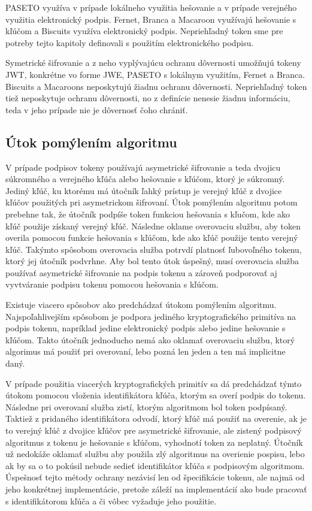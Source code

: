 PASETO využíva v prípade lokálneho využitia hešovanie a v prípade verejného využitia elektronický podpis. Fernet, Branca a Macaroon využívajú hešovanie s kľúčom a Biscuits využíva elektronický podpis. Nepriehľadný token sme pre potreby tejto kapitoly definovali s použitím elektronického podpisu.

Symetrické šifrovanie a z neho vyplývajúcu ochranu dôvernosti umožňujú tokeny JWT, konkrétne vo forme JWE, PASETO s lokálnym využitím, Fernet a Branca. Biscuits a Macaroons neposkytujú žiadnu ochranu dôvernosti. Nepriehľadný token tiež neposkytuje ochranu dôvernosti, no z definície nenesie žiadnu informáciu, teda v jeho prípade nie je dôvernosť čoho chrániť.

\subsection{Útok pomýlením algoritmu}

V prípade podpisov tokeny používajú asymetrické šifrovanie a teda dvojicu súkromného a verejného kľúča alebo hešovanie s kľúčom, ktorý je súkromný. Jediný kľúč, ku ktorému má útočník ľahký prístup je verejný kľúč z dvojice kľúčov použitých pri asymetrickom šifrovaní. Útok pomýlením algoritmu potom prebehne tak, že útočník podpíše token funkciou hešovania s kľučom, kde ako kľúč použije získaný verejný kľúč. Následne oklame overovaciu službu, aby token overila pomocou funkcie hešovania s kľúčom, kde ako kľúč použije tento verejný kľúč. Takýmto spôsobom overovacia služba potrvdí platnosť ľubovoľného tokenu, ktorý jej útočník podvrhne. Aby bol tento útok úspešný, musí overovacia služba používať asymetrické šifrovanie na podpis tokenu a zároveň podporovať aj vyvtváranie podpisu tokenu pomocou hešovania s kľúčom.

Existuje viacero spôsobov ako predchádzať útokom pomýlením algoritmu. Najspoľahlivejším spôsobom je podpora jediného kryptografického primitíva na podpis tokenu, napríklad jedine elektronický podpis alebo jedine hešovanie s kľúčom. Takto útočník jednoducho nemá ako oklamať overovaciu službu, ktorý algorimus má použiť pri overovaní, lebo pozná len jeden a ten má implicitne daný. 

V prípade použitia viacerých kryptografických primitív sa dá predchádzať týmto útokom pomocou vloženia identifikátora kľúča, ktorým sa overí podpis do tokenu. Následne pri overovaní služba zistí, ktorým algoritmom bol token podpísaný. Taktiež z pridaného identifikátora odvodí, ktorý kľúč má použiť na overenie, ak je to verejný kľúč z dvojice kľúčov pre asymetrické šifrovanie, ale zistený podpisový algoritmus z tokenu je hešovanie s kľúčom, vyhodnotí token za neplatný. Útočník už nedokáže oklamať službu aby použila zlý algoritmus na overienie pospisu, lebo ak by sa o to pokúsil nebude sedieť identifikátor kľúča s podpisovým algoritmom. Úspešnosť tejto métody ochrany nezávisí len od špecifikácie tokenu, ale najmä od jeho konkrétnej implementácie, pretože záleží na implementácií ako bude pracovať s identifikátorom kľúča a či vôbec vyžaduje jeho použitie.

